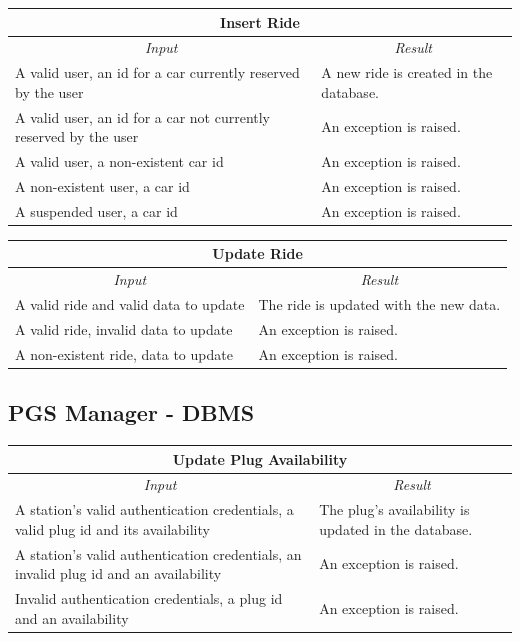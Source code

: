 \documentclass[english]{article}
\begin{document}
\begin{center}
	\begin{tabular}{ | p{6cm} | p{6cm} | }
		\hline 
		\multicolumn{2}{|c|}{\textbf{Insert Ride}} \\
		\hline
		\multicolumn{1}{|c|}{\textit{Input}} & \multicolumn{1}{c|}{\textit{Result}} \\
		\hline
		A valid user, an id for a car currently reserved by the user & A new ride is created in the database. \\
		\hline
		A valid user, an id for a car not currently reserved by the user & An exception is raised. \\
		\hline
		A valid user, a non-existent car id& An exception is raised. \\
		\hline
		A non-existent user, a car id & An exception is raised. \\
		\hline
		A suspended user, a car id & An exception is raised. \\
		\hline
	\end{tabular}
\end{center}


\begin{center}
	\begin{tabular}{ | p{6cm} | p{6cm} | }
		\hline 
		\multicolumn{2}{|c|}{\textbf{Update Ride}} \\
		\hline
		\multicolumn{1}{|c|}{\textit{Input}} & \multicolumn{1}{c|}{\textit{Result}} \\
		\hline
		A valid ride and valid data to update  & The ride is updated with the new data. \\
		\hline
		A valid ride, invalid data to update & An exception is raised. \\
		\hline
		A non-existent ride, data to update & An exception is raised. \\
		\hline
	\end{tabular}
\end{center}

\subsection{PGS Manager - DBMS}

\begin{center}
	\begin{tabular}{ | p{6cm} | p{6cm} | }
		\hline 
		\multicolumn{2}{|c|}{\textbf{Update Plug Availability}} \\
		\hline
		\multicolumn{1}{|c|}{\textit{Input}} & \multicolumn{1}{c|}{\textit{Result}} \\
		\hline
		A station's valid authentication credentials, a valid plug id and its availability & The plug's availability is updated in the database. \\
		\hline
		A station's valid authentication credentials, an invalid plug id and an availability & An exception is raised. \\
		\hline
		Invalid authentication credentials, a plug id and an availability & An exception is raised. \\
		\hline
	\end{tabular}
\end{center}
\end{document}
